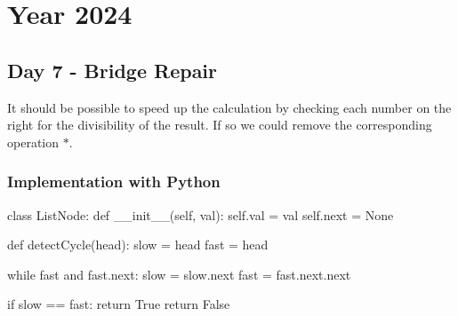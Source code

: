 \documentclass[]{scrartcl}
\begin{document}
\section{Year 2024}

\subsection{Day 7 - Bridge Repair}
It should be possible to speed up the calculation by checking each number on the right for the divisibility of the result. If so we could remove the corresponding operation $*$.

\subsubsection {Implementation with Python}
\begin{ipython}
	class ListNode:
	def __init__(self, val):
	self.val = val
	self.next = None
	
	def detectCycle(head):
	slow = head
	fast = head
	
	while fast and fast.next:
	slow = slow.next
	fast = fast.next.next
	
	if slow == fast:
	return True  
	return False
\end{ipython}
\end{document}
